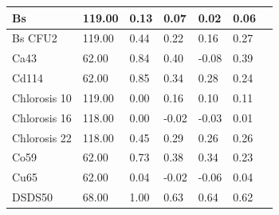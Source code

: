 \documentclass[ngerman,onecolumn,bibliography=totocnumbered]{scrreprt}
\begin{document}
\begin{table}[]
\begin{tabular}{|l|l|l|l|l|l|l|}
Bs  & 119.00  & 0.13  & 0.07  & 0.02  & 0.06 \\ \hline
Bs CFU2  & 119.00  & 0.44  & 0.22  & 0.16  & 0.27 \\ \hline
Ca43  & 62.00  & 0.84  & 0.40  & -0.08  & 0.39 \\ \hline
Cd114  & 62.00  & 0.85  & 0.34  & 0.28  & 0.24 \\ \hline
Chlorosis 10  & 119.00  & 0.00  & 0.16  & 0.10  & 0.11 \\ \hline
Chlorosis 16  & 118.00  & 0.00  & -0.02  & -0.03  & 0.01 \\ \hline
Chlorosis 22  & 118.00  & 0.45  & 0.29  & 0.26  & 0.26 \\ \hline
Co59  & 62.00  & 0.73  & 0.38  & 0.34  & 0.23 \\ \hline
Cu65  & 62.00  & 0.04  & -0.02  & -0.06  & 0.04 \\ \hline
DSDS50  & 68.00  & 1.00  & 0.63  & 0.64  & 0.62 \\ \hline
\end{tabular}
\end{table}
\end{document}
